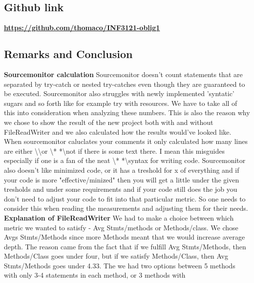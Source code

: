 \documentclass{article}
\begin{document}
\subsection{Github link}
\href{https://github.com/thomaco/INF3121-oblig1}{\textbf{https://github.com/thomaco/INF3121-oblig1}}

\subsection{Remarks and Conclusion}%
\textbf{Sourcemonitor calculation\vspace{0.2cm}\newline}
Sourcemonitor doesn't count statements that are separated
by try-catch or nested try-catches even though they are guaranteed to be
executed.  Sourcemonitor also struggles with newly implemented 'syntatic' sugars and so forth like for example try with resources. We have to take all of this into consideration when analyzing these numbers.
This is also the reason why we chose to show the result of the new project both with and without FileReadWriter and we also calculated how the results would've looked like.  When sourcemonitor caluclates your comments it only calculated how many lines are either \textbackslash \textbackslash or \textbackslash* * *\textbackslash not if there is some text there. I mean this misguides especially if one is a fan of the neat \textbackslash* * *\textbackslash syntax for writing code. Sourcemonitor also doesn't like minimized code, or it has a treshold for x of everything
and if your code is more "effective/minized" then you will get a little under the given tresholds and under some requirements and if your code still does the job you don't need to adjust your code to fit into that particular metric.  So one needs to consider this when reading the measurements and adjusting them for their needs. \vspace{0.3cm} \newline
\vspace{0.1cm}
\textbf{Explanation of FileReadWriter\newline}
We had to make a choice between which metric we wanted to satisfy -
Avg Stmts/methods or Methods/class. We chose Avgs Stmts/Methods since
more Methods meant that we would increase average depth. The reason
came from the fact that if we fulfill Avg Stmts/Methods, then
Methods/Class goes under four, but if we satisfy Methods/Class, then
Avg Stmts/Methods goes under 4.33. The we had two options between
5 methods with only 3-4 statements in each method, or 3 methods with
\end{document}
